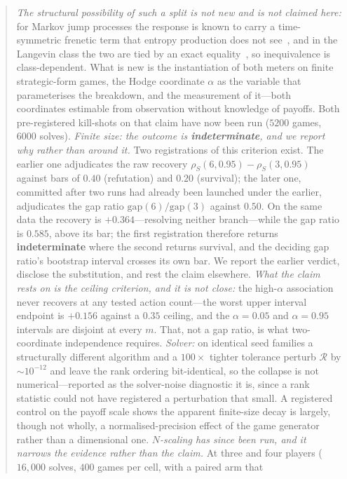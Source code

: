 \documentclass[10pt,a4paper]{article}
\newcommand{\R}{\mathcal{R}}
\begin{document}
\begin{abstract}
\emph{The structural possibility of such a split is not new and is not claimed here:} for
Markov jump processes the response is known to carry a time-symmetric frenetic term that
entropy production does not see~\cite{baiesi2009}, and in the Langevin class the two are tied
by an exact equality~\cite{haradasasa2005}, so inequivalence is class-dependent. What is new
is the instantiation of both meters on finite strategic-form games, the Hodge coordinate
$\alpha$ as the variable that parameterises the breakdown, and the measurement of it---both
coordinates estimable from observation without knowledge of payoffs. Both pre-registered
kill-shots on that claim have now been run ($5200$ games, $6000$ solves).
\emph{Finite size: the outcome is \textbf{indeterminate}, and we report why rather than
around it.} Two registrations of this criterion exist. The earlier one adjudicates the raw
recovery $\rho_S(6,0.95)-\rho_S(3,0.95)$ against bars of $0.40$ (refutation) and $0.20$
(survival); the later one, committed after two runs had already been launched under the
earlier, adjudicates the gap ratio $\mathrm{gap}(6)/\mathrm{gap}(3)$ against $0.50$. On the
same data the recovery is $+0.364$---resolving neither branch---while the gap ratio is
$0.585$, above its bar; the first registration therefore returns \textbf{indeterminate}
where the second returns survival, and the deciding gap ratio's bootstrap interval crosses
its own bar. We report the earlier verdict, disclose the substitution, and rest the claim
elsewhere. \emph{What the claim rests on is the ceiling criterion, and it is not close:} the
high-$\alpha$ association never recovers at any tested action count---the worst upper
interval endpoint is $+0.156$ against a $0.35$ ceiling, and the $\alpha=0.05$ and
$\alpha=0.95$ intervals are disjoint at every $m$. That, not a gap ratio, is what
two-coordinate independence requires. \emph{Solver:} on identical seed families a
structurally different algorithm and a $100\times$ tighter tolerance perturb $\R$ by
$\sim\!10^{-12}$ and leave the rank ordering bit-identical, so the collapse is not
numerical---reported as the solver-noise diagnostic it is, since a rank statistic could not
have registered a perturbation that small. A registered control on the payoff scale shows
the apparent finite-size decay is largely, though not wholly, a normalised-precision effect
of the game generator rather than a dimensional one. \emph{$N$-scaling has since been run, and it narrows the evidence rather than the claim.}
At three and four players ($16{,}000$ solves, $400$ games per cell, with a paired arm that

\end{abstract}
\end{document}
